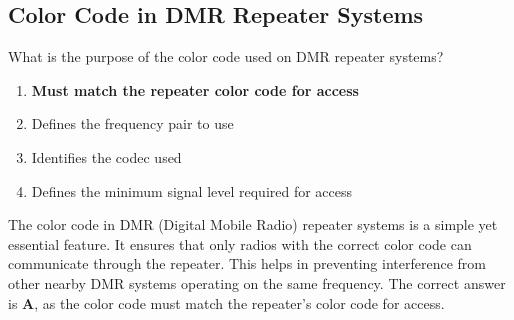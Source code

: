 \subsection{Color Code in DMR Repeater Systems}
\label{T2B12}

\begin{tcolorbox}[colback=gray!10!white,colframe=black!75!black,title=T2B12]
What is the purpose of the color code used on DMR repeater systems?
\begin{enumerate}[noitemsep]
    \item \textbf{Must match the repeater color code for access}
    \item Defines the frequency pair to use
    \item Identifies the codec used
    \item Defines the minimum signal level required for access
\end{enumerate}
\end{tcolorbox}

The color code in DMR (Digital Mobile Radio) repeater systems is a simple yet essential feature. It ensures that only radios with the correct color code can communicate through the repeater. This helps in preventing interference from other nearby DMR systems operating on the same frequency. The correct answer is \textbf{A}, as the color code must match the repeater's color code for access.